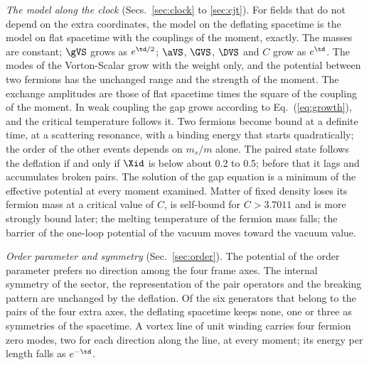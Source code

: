 \emph{The model along the clock} (Secs.~\ref{sec:clock} to \ref{sec:cjt}). For fields that do not
depend on the extra coordinates, the model on the deflating spacetime is the model on flat spacetime
with the couplings of the moment, exactly. The masses are constant; $\gVS$ grows as
$e^{\td/2}$; $\aVS$, $\GVS$, $\DVS$ and $C$ grow as $e^{\td}$. The modes of the Vorton-Scalar grow
with the weight only, and the potential between two fermions has the unchanged range and the
strength of the moment. The exchange amplitudes are those of flat spacetime times the square of the
coupling of the moment. In weak coupling the gap grows according to Eq.~(\ref{eq:growth}), and the
critical temperature follows it. Two fermions become bound at a definite time, at a scattering
resonance, with a binding energy that starts quadratically; the order of the other events depends on
$m_s/m$ alone. The paired state follows the deflation if and only if $\Xid$ is below about 0.2 to
0.5; before that it lags and accumulates broken pairs. The solution of the gap equation is a minimum
of the effective potential at every moment examined. Matter of fixed density loses its fermion mass
at a critical value of $C$, is self-bound for $C>3.7011$ and is more strongly bound later; the
melting temperature of the fermion mass falls; the barrier of the one-loop potential of the vacuum
moves toward the vacuum value.

\emph{Order parameter and symmetry} (Sec.~\ref{sec:order}). The potential of the order parameter
prefers no direction among the four frame axes. The internal symmetry of the sector, the
representation of the pair operators and the breaking pattern are unchanged by the deflation. Of the
six generators that belong to the pairs of the four extra axes, the deflating spacetime keeps none,
one or three as symmetries of the spacetime. A vortex line of unit winding carries four fermion zero
modes, two for each direction along the line, at every moment; its energy per length falls as
$e^{-\td}$.

